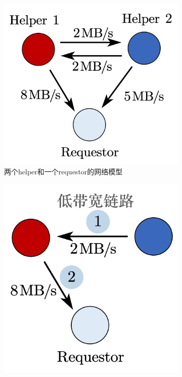 \begin{figure}[tb!]
	\centering
	\begin{subfigure}[t]{0.4\textwidth}
		\centering
		\includegraphics[scale=0.25]{figures/2.3-1.pdf}
		\caption{两个helper和一个requestor的网络模型}
		\label{fig:2.3-1}
	\end{subfigure}
	\begin{subfigure}[t]{0.4\textwidth}
		\centering
		\includegraphics[scale=0.25]{figures/2.3-2.pdf}

\end{subfigure}
\end{figure}
